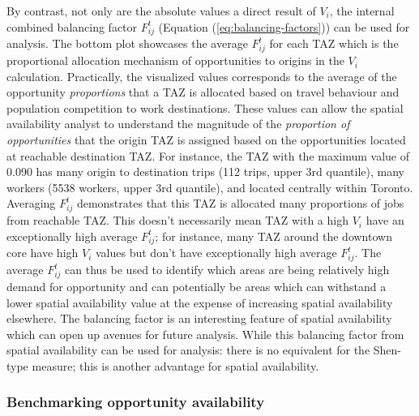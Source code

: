 \documentclass[]{elsarticle} %
\begin{document}
By contrast, not only are the absolute values a direct result of
\(V_i\), the internal combined balancing factor \(F_{ij}^t\) (Equation
(\ref{eq:balancing-factors})) can be used for analysis. The bottom plot
showcases the average \(F_{ij}^t\) for each TAZ which is the
proportional allocation mechanism of opportunities to origins in the
\(V_i\) calculation. Practically, the visualized values corresponds to
the average of the opportunity \emph{proportions} that a TAZ is
allocated based on travel behaviour and population competition to work
destinations. These values can allow the spatial availability analyst to
understand the magnitude of the \emph{proportion of opportunities} that
the origin TAZ is assigned based on the opportunities located at
reachable destination TAZ. For instance, the TAZ with the maximum value
of 0.090 has many origin to destination trips (112 trips, upper 3rd
quantile), many workers (5538 workers, upper 3rd quantile), and located
centrally within Toronto. Averaging \(F_{ij}^t\) demonstrates that this
TAZ is allocated many proportions of jobs from reachable TAZ. This
doesn't necessarily mean TAZ with a high \(V_i\) have an exceptionally
high average \(F_{ij}^t\); for instance, many TAZ around the downtown
core have high \(V_i\) values but don't have exceptionally high average
\(F_{ij}^t\). The average \(F_{ij}^t\) can thus be used to identify
which areas are being relatively high demand for opportunity and can
potentially be areas which can withstand a lower spatial availability
value at the expense of increasing spatial availability elsewhere. The
balancing factor is an interesting feature of spatial availability which
can open up avenues for future analysis. While this balancing factor
from spatial availability can be used for analysis: there is no
equivalent for the Shen-type measure; this is another advantage for
spatial availability.

\hypertarget{benchmarking-opportunity-availability}{%
\subsubsection{Benchmarking opportunity
availability}\label{benchmarking-opportunity-availability}}
\end{document}
